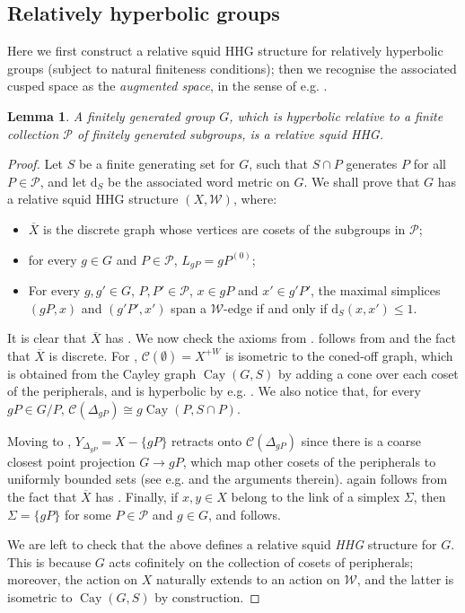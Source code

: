 \documentclass[svgnames]{amsart}
\theoremstyle{plain}
\newtheorem{lem}[thm]{Lemma}
\theoremstyle{definition}
\newcommand{\C}[1]{\mathcal{C}(#1)}
\newcommand{\dist}{\mathrm{d}}
\newcommand{\W}{\mathcal{W}}
\newcommand{\duaug}[2]{{#1}^{+{#2}}}
\newcommand{\squid}[1]{squid}
\newcommand{\Cay}[2]{\operatorname{Cay}\left(#1,#2\right)}
\newcommand{\ov}[1]{\overline{#1}}
\begin{document}
 \subsection{Relatively hyperbolic groups}
    Here we first construct a relative \squid{} HHG structure for relatively hyperbolic groups (subject to natural finiteness conditions); then we recognise the associated cusped space as the \emph{augmented space}, in the sense of e.g. \cite[Definition 4.3]{Hruska}.

    \begin{lem}\label{lem:relhyp_is_squid}
        A finitely generated group $G$, which is hyperbolic relative to a finite collection $\mathcal P$ of finitely generated subgroups, is a relative \squid{} HHG.
    \end{lem}
    \begin{proof} Let $S$ be a finite generating set for $G$, such that $S\cap P$ generates $P$ for all $P\in \mathcal P$, and let $\dist_S$ be the associated word metric on $G$. We shall prove that $G$ has a relative \squid{} HHG structure $(X,\W)$, where:
        \begin{itemize}
            \item $\ov X$ is the discrete graph whose vertices are cosets of the subgroups in $\mathcal P$;
            \item for every $g\in G$ and $P\in \mathcal P$, $L_{gP}=gP^{(0)}$;
            \item For every $g,g'\in G$, $P,P'\in\mathcal P$, $x\in gP$ and $x'\in g'P'$, the maximal simplices $(gP,x)$ and $(g'P',x')$ span a $\W$-edge if and only if $\dist_S(x,x')\le 1$.
        \end{itemize}
        It is clear that $\ov X$ has \cleanish{}. We now check the axioms from .   follows from  and the fact that $\ov X$ is discrete. For , $\C{\emptyset}=\duaug{X}{W}$ is isometric to the coned-off graph, which is obtained from the Cayley graph $\Cay{G}{S}$ by adding a cone over each coset of the peripherals, and is hyperbolic by e.g. \cite[Theorem 5.1]{Hruska}. We also notice that, for every $gP\in G/P$, $\C{\Delta_{gP}}\cong g\Cay{P}{S\cap P}$. 
        
        Moving to , $Y_{\Delta_{gP}}=X-\{gP\}$ retracts onto $\C{\Delta_{gP}}$ since there is a coarse closest point projection $G\to gP$, which map other cosets of the peripherals to uniformly bounded sets (see e.g. \cite[Theorem 2.14]{Sisto_proj_relhyp} and the arguments therein).  again follows from the fact that $\ov X$ has \cleanish{}. Finally, if $x,y\in X$ belong to the link of a simplex $\Sigma$, then $\Sigma=\{gP\}$ for some $P\in \mathcal P$ and $g\in G$, and  follows.

        We are left to check that the above defines a relative \squid{} \emph{HHG} structure for $G$. This is because $G$ acts cofinitely on the collection of cosets of peripherals; moreover, the action on $X$ naturally extends to an action on $\W$, and the latter is isometric to $\Cay{G}{S}$ by construction.
    \end{proof}
\end{document}
